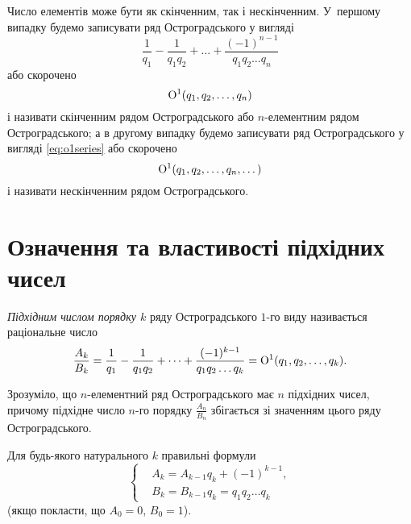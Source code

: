 Число елементів може бути як скінченним, так і нескінченним.
У~першому випадку будемо записувати ряд Остроградського у вигляді
\[
\frac1{q_1}-\frac1{q_1q_2}+\dots +\frac{(-1)^{n-1}}{q_1q_2\dots
q_n}
\]
або скорочено
\begin{equation*}
\mathrm{O}^{1}(q_1,q_2,\dots,q_n)
\end{equation*}
і називати скінченним рядом Остроградського або
$n$\nobreakdash-\hspace{0pt}елементним рядом Остроградського; а в
другому випадку будемо записувати ряд Остроградського у вигляді
\eqref{eq:o1series} або скорочено
\begin{equation*}
\mathrm{O}^{1}(q_1,q_2,\dots,q_n,\dots)
\end{equation*}
і називати нескінченним рядом Остроградського.


\section{Означення та властивості підхідних чисел}

\begin{definition}\label{def:convergent}
\emph{Підхідним числом порядку $k$} ряду Остроградського $1$-го
виду називається раціональне число
\[
\frac{A_k}{B_k} = \frac{1}{q_1}-\frac{1}{q_1q_2}+\dots
+\frac{(-1)^{k-1}}{q_1q_2\dots q_k} = \mathrm{O}^{1}(q_1,q_2,\dots,q_k).
\]
\end{definition}

Зрозуміло, що $n$-елементний ряд Остроградського має $n$ підхідних
чисел, причому підхідне число $n$-го порядку $\frac{A_n}{B_n}$
збігається зі значенням цього ряду Остроградського.

\begin{theorem}\label{th:convergents}
Для будь-якого натурального $k$ правильні формули
\begin{equation}\label{eq:convergents}
\left\{
\begin{aligned}
&A_k=A_{k-1}q_k+(-1)^{k-1},\\
&B_k=B_{k-1}q_k=q_1q_2\dots q_k
\end{aligned}
\right.
\end{equation}
\textup(якщо покласти, що $A_0=0$, $B_0=1$\textup).
\end{theorem}

